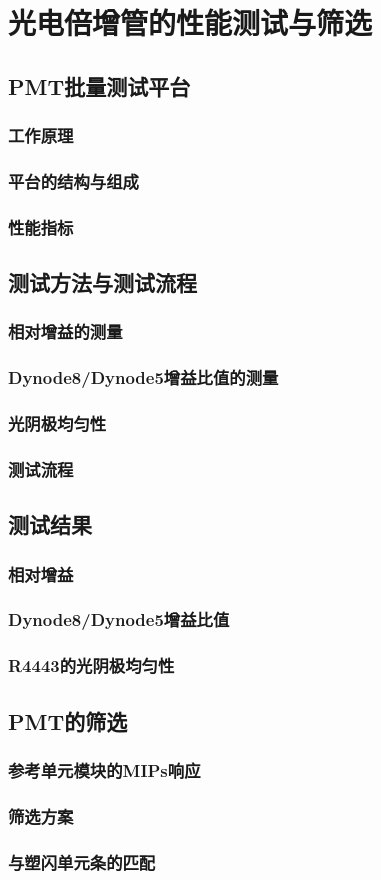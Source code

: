 \chapter{光电倍增管的性能测试与筛选}
\label{ch:pmt_characterization}

\section{PMT批量测试平台}
\subsection{工作原理}
\subsection{平台的结构与组成}
\subsection{性能指标}

\section{测试方法与测试流程}
\subsection{相对增益的测量}
\subsection{Dynode8/Dynode5增益比值的测量}
\subsection{光阴极均匀性}
\subsection{测试流程}

\section{测试结果}
\subsection{相对增益}
\subsection{Dynode8/Dynode5增益比值}
\subsection{R4443的光阴极均匀性}

\section{PMT的筛选}
\subsection{参考单元模块的MIPs响应}
\subsection{筛选方案}
\subsection{与塑闪单元条的匹配}